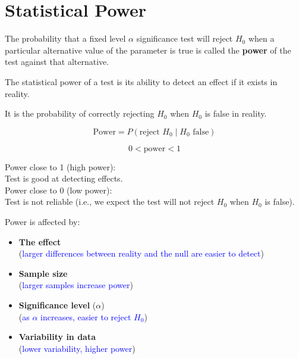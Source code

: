 \chapter{Statistical Power}

\begin{definition}
The probability that a fixed level $\alpha$ significance test will reject $H_0$ when a particular alternative value of the parameter is true is called the \textbf{power} of the test against that alternative.
\end{definition}

The statistical power of a test is its ability to detect an effect if it exists in reality.

It is the probability of correctly rejecting $H_0$ when $H_0$ is false in reality.

\begin{equation*}
\text{Power} = P(\text{reject } H_0 \mid H_0 \text{ false})
\end{equation*}

\begin{equation*}
0 < \text{power} < 1
\end{equation*}

Power close to 1 (high power):\\
\quad Test is good at detecting effects.\\

Power close to 0 (low power):\\
\quad Test is not reliable (i.e., we expect the test will not reject $H_0$ when $H_0$ is false).

\vspace{1em}
Power is affected by:

\begin{itemize}
 \item \textbf{The effect} \\ (\textcolor{blue}{larger differences between reality and the null are easier to detect})

  \item \textbf{Sample size} \\ (\textcolor{blue}{larger samples increase power})

  \item \textbf{Significance level} ($\alpha$) \\ (\textcolor{blue}{as $\alpha$ increases, easier to reject $H_0$})

  \item \textbf{Variability in data} \\ (\textcolor{blue}{lower variability, higher power})
\end{itemize}
